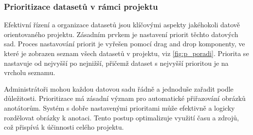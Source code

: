 \subsubsection{Prioritizace datasetů v rámci projektu}
Efektivní řízení a organizace datasetů jsou klíčovými aspekty jakéhokoli datově orientovaného projektu. Zásadním prvkem je nastavení priorit těchto datových sad. Proces nastavování priorit je vyřešen pomocí drag and drop komponenty, ve které je zobrazen seznam všech datasetů v projektu, viz \vref{fig:p_poradi}. Priorita se nastavuje od nejvyšší po nejnižší, přičemž dataset s nejvyšší prioritou je na vrcholu seznamu.


Administrátoři mohou každou datovou sadu řádně a jednoduše zařadit podle důležitosti. Prioritizace má zásadní význam pro automatické přiřazování obrázků anotátorům. Systém s dobře nastavenými prioritami může efektivně a logicky rozdělovat obrázky k anotaci. Tento postup optimalizuje využití času a zdrojů, což přispívá k účinnosti celého projektu.

